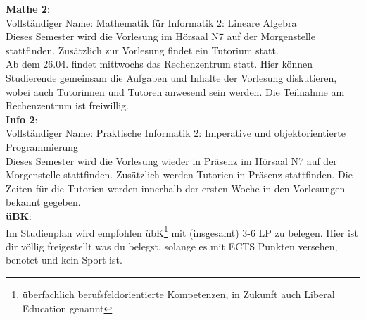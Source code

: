 \textbf{Mathe 2}:\\
Vollständiger Name: Mathematik für Informatik 2: Lineare Algebra\\
Dieses Semester wird die Vorlesung im Hörsaal N7 auf der Morgenstelle stattfinden.
Zusätzlich zur Vorlesung findet ein Tutorium statt. \\
Ab dem 26.04. findet mittwochs das Rechenzentrum statt. Hier können Studierende gemeinsam die Aufgaben und Inhalte der Vorlesung diskutieren,
wobei auch Tutorinnen und Tutoren anwesend sein werden. Die Teilnahme am Rechenzentrum ist freiwillig.\\

\textbf{Info 2}:\\
Vollständiger Name: Praktische Informatik 2: Imperative und objektorientierte Programmierung\\
Dieses Semester wird die Vorlesung wieder in Präsenz im Hörsaal N7 auf der Morgenstelle stattfinden.
Zusätzlich werden Tutorien in Präsenz stattfinden.
Die Zeiten für die Tutorien werden innerhalb der ersten Woche in den Vorlesungen bekannt gegeben.\\

\textbf{üBK}:\\
Im Studienplan wird empfohlen übK\footnote{überfachlich berufsfeldorientierte Kompetenzen, in Zukunft auch Liberal Education genannt}
mit (insgesamt) 3-6 LP zu belegen. Hier ist dir völlig freigestellt was du belegst, solange es mit ECTS Punkten versehen, benotet und kein Sport ist.\\
